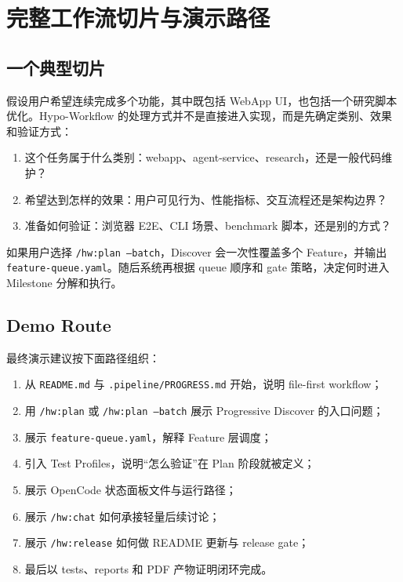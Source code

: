 \documentclass[
  outputdir=build,
  chapterstyle=cn,
  colorscheme=Simple,
  fontset=tech,
  code=false
]{Hypo-Note}
\begin{document}
\chapter{完整工作流切片与演示路径}

\section{一个典型切片}

假设用户希望连续完成多个功能，其中既包括 WebApp UI，也包括一个研究脚本优化。Hypo-Workflow 的处理方式并不是直接进入实现，而是先确定类别、效果和验证方式：

\begin{enumerate}[leftmargin=2em]
  \item 这个任务属于什么类别：webapp、agent-service、research，还是一般代码维护？
  \item 希望达到怎样的效果：用户可见行为、性能指标、交互流程还是架构边界？
  \item 准备如何验证：浏览器 E2E、CLI 场景、benchmark 脚本，还是别的方式？
\end{enumerate}

如果用户选择 \texttt{/hw:plan --batch}，Discover 会一次性覆盖多个 Feature，并输出 \texttt{feature-queue.yaml}。随后系统再根据 queue 顺序和 gate 策略，决定何时进入 Milestone 分解和执行。

\section{Demo Route}

最终演示建议按下面路径组织：

\begin{enumerate}[leftmargin=2em]
  \item 从 \texttt{README.md} 与 \texttt{.pipeline/PROGRESS.md} 开始，说明 file-first workflow；
  \item 用 \texttt{/hw:plan} 或 \texttt{/hw:plan --batch} 展示 Progressive Discover 的入口问题；
  \item 展示 \texttt{feature-queue.yaml}，解释 Feature 层调度；
  \item 引入 Test Profiles，说明“怎么验证”在 Plan 阶段就被定义；
  \item 展示 OpenCode 状态面板文件与运行路径；
  \item 展示 \texttt{/hw:chat} 如何承接轻量后续讨论；
  \item 展示 \texttt{/hw:release} 如何做 README 更新与 release gate；
  \item 最后以 tests、reports 和 PDF 产物证明闭环完成。
\end{enumerate}
\end{document}
